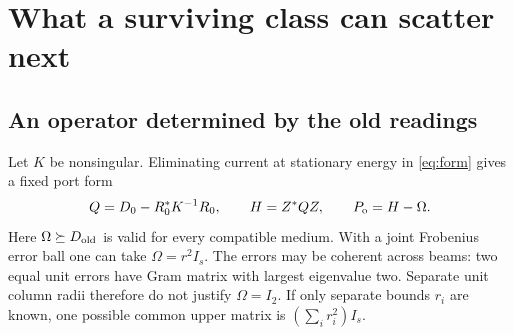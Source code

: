 \section{What a surviving class can scatter next}\label{sec:response}
\subsection{An operator determined by the old readings}
Let $K$ be nonsingular. Eliminating current at stationary energy in \eqref{eq:form} gives a fixed port form
\begin{equation}
 Q=D_0-R_0^*K^{-1}R_0,\qquad H=Z^*QZ,\qquad P_{\mathrm o}=H-\Omega .
 \label{eq:Q}
\end{equation}
Here $\Omega\succeq D_{\rm old}$ is valid for every compatible medium. With a joint Frobenius error ball one can take $\Omega=r^2 I_s$. The errors may be coherent across beams: two equal unit errors have Gram matrix with largest eigenvalue two. Separate unit column radii therefore do not justify $\Omega=I_2$. If only separate bounds $r_i$ are known, one possible common upper matrix is $(\sum_i r_i^2)I_s$.

